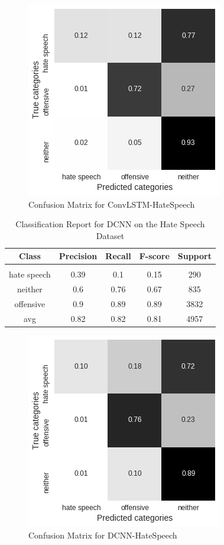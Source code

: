 \documentclass[11pt, oneside]{article}   	%
\begin{document}
\begin{figure}[h]
\centering
\includegraphics[width=0.6\linewidth]{ConvLSTM-HateSpeech}
\caption{Confusion Matrix for ConvLSTM-HateSpeech}
\label{fig:ConvLSTM-HateSpeech}
\end{figure}

\newpage
\begin{table}[h]
\centering
\caption{Classification Report for DCNN on the Hate Speech Dataset}
\begin{tabular}{c | c c c c}
Class & Precision & Recall & F-score & Support\\
\hline
\hline\\
hate speech & 0.39 & 0.1 & 0.15 & 290\\
neither & 0.6 & 0.76 & 0.67 & 835\\
offensive & 0.9 & 0.89 & 0.89 & 3832\\
avg & 0.82 & 0.82 & 0.81 & 4957\\
\end{tabular}
\end{table}

\begin{figure}[h]
\centering
\includegraphics[width=0.6\linewidth]{DCNN-HateSpeech}
\caption{Confusion Matrix for DCNN-HateSpeech}
\label{fig:DCNN-HateSpeech}
\end{figure}
\end{document}
